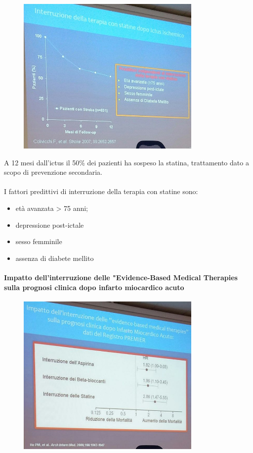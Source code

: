 \begin{figure}[!ht]
\centering
	\includegraphics[width=0.8\textwidth]{41/image2.jpeg}
	\end{figure}

A 12 mesi dall'ictus il 50\% dei pazienti ha sospeso la statina,
trattamento dato a scopo di prevenzione secondaria.
\\\\
I fattori predittivi di interruzione della terapia con statine sono:

\begin{itemize}
\item
  età avanzata \textgreater{} 75 anni;
\item
  depressione post-ictale
\item
  sesso femminile
\item
  assenza di diabete mellito
\end{itemize}

\paragraph{Impatto dell'interruzione delle "Evidence-Based Medical Therapies sulla prognosi clinica dopo infarto miocardico acuto}

\begin{figure}[!ht]
\centering
	\includegraphics[width=0.8\textwidth]{41/image3.jpeg}
	\end{figure}
	
